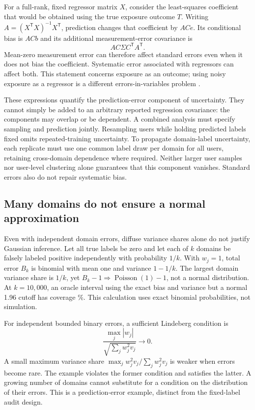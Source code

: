 \documentclass[11pt,letterpaper]{article}
\begin{document}
For a full-rank, fixed regressor matrix $X$, consider the least-squares
coefficient that would be obtained using the true exposure outcome $T$.
Writing $A=(X^{\mathsf T}X)^{-1}X^{\mathsf T}$, prediction changes that
coefficient by $ACe$. Its conditional bias is $ACb$ and its additional
measurement-error covariance is
\begin{equation}\label{eq:regression}
 AC\Sigma C^{\mathsf T}A^{\mathsf T}.
\end{equation}
Mean-zero measurement error can therefore affect standard errors even when it
does not bias the coefficient. Systematic error associated with regressors
can affect both. This statement concerns exposure as an outcome; using noisy
exposure as a regressor is a different errors-in-variables problem
\citep{fong2021predictions}.

These expressions quantify the prediction-error component of uncertainty.
They cannot simply be added to an arbitrary reported regression covariance:
the components may overlap or be dependent. A combined analysis must specify
sampling and prediction jointly. Resampling users while holding predicted
labels fixed omits repeated-training uncertainty. To propagate domain-label
uncertainty, each replicate must use one common label draw per domain for all
users, retaining cross-domain dependence where required. Neither larger user
samples nor user-level clustering alone guarantees that this component vanishes.
Standard errors also do not repair systematic bias.

\subsection{Many domains do not ensure a normal approximation}
Even with independent domain errors, diffuse variance shares alone do not
justify Gaussian inference. Let all true labels be zero and let each of $k$
domains be falsely labeled positive independently with probability $1/k$.
With $w_j=1$, total error $B_k$ is binomial with mean one and variance $1-1/k$.
The largest domain variance share is $1/k$, yet
$B_k-1\Rightarrow\operatorname{Poisson}(1)-1$, not a normal distribution.
At $k=10{,}000$, an oracle interval using the exact bias and variance but a
normal 1.96 cutoff has coverage \RareNormalCoverage{}\%. This calculation
uses exact binomial probabilities, not simulation.

For independent bounded binary errors, a sufficient Lindeberg condition is
\[\frac{\max_j|w_j|}{\sqrt{\sum_jw_j^2v_j}}\to0.\]
A small maximum variance share
$\max_j w_j^2v_j/\sum_jw_j^2v_j$ is weaker when errors become rare. The example
violates the former condition and satisfies the latter. A growing number of
domains cannot substitute for a condition on the distribution of their errors.
This is a prediction-error example, distinct from the fixed-label audit design.
\end{document}
